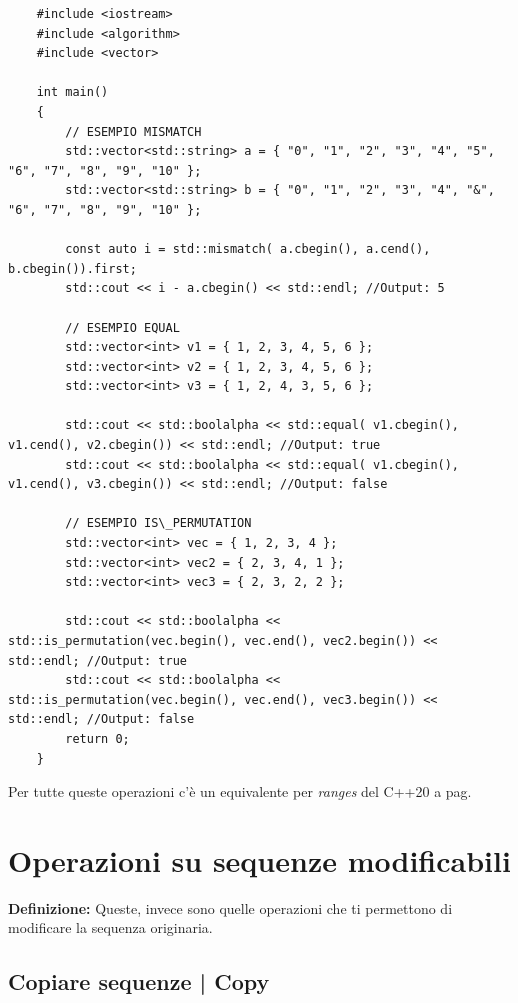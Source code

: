 \begin{lstlisting}
	#include <iostream>
	#include <algorithm>
	#include <vector>
	
	int main()
	{
		// ESEMPIO MISMATCH
		std::vector<std::string> a = { "0", "1", "2", "3", "4", "5", "6", "7", "8", "9", "10" };
		std::vector<std::string> b = { "0", "1", "2", "3", "4", "&", "6", "7", "8", "9", "10" };
		
		const auto i = std::mismatch( a.cbegin(), a.cend(), b.cbegin()).first;
		std::cout << i - a.cbegin() << std::endl; //Output: 5
		
		// ESEMPIO EQUAL
		std::vector<int> v1 = { 1, 2, 3, 4, 5, 6 };
		std::vector<int> v2 = { 1, 2, 3, 4, 5, 6 };
		std::vector<int> v3 = { 1, 2, 4, 3, 5, 6 };
		
		std::cout << std::boolalpha << std::equal( v1.cbegin(), v1.cend(), v2.cbegin()) << std::endl; //Output: true
		std::cout << std::boolalpha << std::equal( v1.cbegin(), v1.cend(), v3.cbegin()) << std::endl; //Output: false
		
		// ESEMPIO IS\_PERMUTATION
		std::vector<int> vec = { 1, 2, 3, 4 };
		std::vector<int> vec2 = { 2, 3, 4, 1 };
		std::vector<int> vec3 = { 2, 3, 2, 2 };
		
		std::cout << std::boolalpha << std::is_permutation(vec.begin(), vec.end(), vec2.begin()) << std::endl; //Output: true
		std::cout << std::boolalpha << std::is_permutation(vec.begin(), vec.end(), vec3.begin()) << std::endl; //Output: false
		return 0;
	}
\end{lstlisting}

\fleuron %

\textsf{\small Per tutte queste operazioni c'è un equivalente per \emph{ranges} del C++20 a pag. \pageref{ranges_seq_non_modificabili}} \\


\newpage

\section{Operazioni su sequenze modificabili}

\textsf{\small \textbf{Definizione: } Queste, invece sono quelle operazioni che ti permettono di modificare la sequenza originaria.} \\

\subsection{Copiare sequenze | Copy}

